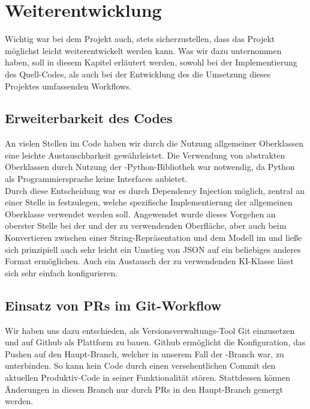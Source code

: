 \chapter{Weiterentwicklung}
\label{ch:weiterentwicklung}

Wichtig war bei dem Projekt auch, stets sicherzustellen, dass das Projekt möglichst leicht weiterentwickelt werden kann.
Was wir dazu unternommen haben, soll in diesem Kapitel erläutert werden, sowohl bei der Implementierung des Quell-Codes,
als auch bei der Entwicklung des die Umsetzung dieses Projektes umfassenden Workflows.

\section{Erweiterbarkeit des Codes}
\label{sec:erweiterbarkeit}

An vielen Stellen im Code haben wir durch die Nutzung allgemeiner Oberklassen eine leichte Austauschbarkeit
gewährleistet.
Die Verwendung von abstrakten Oberklassen durch Nutzung der -Python-Bibliothek war notwendig, da Python
als Programmiersprache keine Interfaces anbietet. \\

Durch diese Entscheidung war es durch Dependency Injection möglich, zentral an einer Stelle in 
festzulegen, welche spezifische Implementierung der allgemeinen Oberklasse verwendet werden soll.
Angewendet wurde dieses Vorgehen an oberster Stelle bei der  und der zu verwendenden Oberfläche, aber
auch beim Konvertieren zwischen einer String-Repräsentation und dem Modell im  und 
ließe sich prinzipiell auch sehr leicht ein Umstieg von JSON auf ein beliebiges anderes Format ermöglichen.
Auch ein Austausch der zu verwendenden \ac{KI}-Klasse lässt sich sehr einfach konfigurieren.

\section{Einsatz von PRs im Git-Workflow}
\label{sec:git-workflow}

Wir haben uns dazu entschieden, als Versionsverwaltungs-Tool Git einzusetzen und auf Github als Plattform zu bauen.
Github ermöglicht die Konfiguration, das Pushen auf den Haupt-Branch, welcher in unserem Fall der -Branch war,
zu unterbinden.
So kann kein Code durch einen versehentlichen Commit den aktuellen Produktiv-Code in seiner Funktionalität stören.
Stattdessen können Änderungen in diesen Branch nur durch \ac{PR}s in den Haupt-Branch gemergt werden. \\

